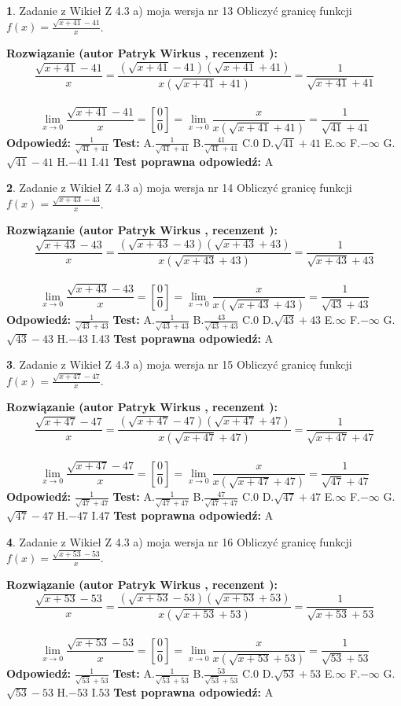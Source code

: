 \documentclass[12pt, a4paper]{article}
\theoremstyle{definition} %
\newtheorem{zad}{}
\newcommand{\zadStart}[1]{\begin{zad}#1\newline}
\newcommand{\zadStop}{\end{zad}}
\newcommand{\rozwStart}[2]{\noindent \textbf{Rozwiązanie (autor #1 , recenzent #2): }\newline}
\newcommand{\rozwStop}{\newline}
\newcommand{\odpStart}{\noindent \textbf{Odpowiedź:}\newline}
\newcommand{\odpStop}{\newline}
\newcommand{\testStart}{\noindent \textbf{Test:}\newline}
\newcommand{\testStop}{\newline}
\newcommand{\kluczStart}{\noindent \textbf{Test poprawna odpowiedź:}\newline}
\newcommand{\kluczStop}{\newline}
\begin{document}
\zadStart{Zadanie z Wikieł Z 4.3 a) moja wersja nr 13}
Obliczyć granicę funkcji $f(x)=\frac{\sqrt{x+41}-41}{x}$.
\zadStop
\rozwStart{Patryk Wirkus}{}
$$\frac{\sqrt{x+41}-41}{x}=\frac{(\sqrt{x+41}-41)(\sqrt{x+41}+41)}{x(\sqrt{x+41}+41)}=\frac{1}{\sqrt{x+41}+41}$$
\\
$$\lim\limits_{x\to0}\frac{\sqrt{x+41}-41}{x}=[\frac{0}{0}]=
\lim\limits_{x\to0}\frac{x}{x(\sqrt{x+41}+41)} = \frac{1}{\sqrt{41}+41}$$
\rozwStop
\odpStart
$\frac{1}{\sqrt{41}+41}$
\odpStop
\testStart
A.$\frac{1}{\sqrt{41}+41}$
B.$\frac{41}{\sqrt{41}+41}$
C.$0$
D.$\sqrt{41}+41$
E.$\infty$
F.$-\infty$
G.$\sqrt{41}-41$
H.$-41$
I.$41$
\testStop
\kluczStart
A
\kluczStop



\zadStart{Zadanie z Wikieł Z 4.3 a) moja wersja nr 14}
Obliczyć granicę funkcji $f(x)=\frac{\sqrt{x+43}-43}{x}$.
\zadStop
\rozwStart{Patryk Wirkus}{}
$$\frac{\sqrt{x+43}-43}{x}=\frac{(\sqrt{x+43}-43)(\sqrt{x+43}+43)}{x(\sqrt{x+43}+43)}=\frac{1}{\sqrt{x+43}+43}$$
\\
$$\lim\limits_{x\to0}\frac{\sqrt{x+43}-43}{x}=[\frac{0}{0}]=
\lim\limits_{x\to0}\frac{x}{x(\sqrt{x+43}+43)} = \frac{1}{\sqrt{43}+43}$$
\rozwStop
\odpStart
$\frac{1}{\sqrt{43}+43}$
\odpStop
\testStart
A.$\frac{1}{\sqrt{43}+43}$
B.$\frac{43}{\sqrt{43}+43}$
C.$0$
D.$\sqrt{43}+43$
E.$\infty$
F.$-\infty$
G.$\sqrt{43}-43$
H.$-43$
I.$43$
\testStop
\kluczStart
A
\kluczStop



\zadStart{Zadanie z Wikieł Z 4.3 a) moja wersja nr 15}
Obliczyć granicę funkcji $f(x)=\frac{\sqrt{x+47}-47}{x}$.
\zadStop
\rozwStart{Patryk Wirkus}{}
$$\frac{\sqrt{x+47}-47}{x}=\frac{(\sqrt{x+47}-47)(\sqrt{x+47}+47)}{x(\sqrt{x+47}+47)}=\frac{1}{\sqrt{x+47}+47}$$
\\
$$\lim\limits_{x\to0}\frac{\sqrt{x+47}-47}{x}=[\frac{0}{0}]=
\lim\limits_{x\to0}\frac{x}{x(\sqrt{x+47}+47)} = \frac{1}{\sqrt{47}+47}$$
\rozwStop
\odpStart
$\frac{1}{\sqrt{47}+47}$
\odpStop
\testStart
A.$\frac{1}{\sqrt{47}+47}$
B.$\frac{47}{\sqrt{47}+47}$
C.$0$
D.$\sqrt{47}+47$
E.$\infty$
F.$-\infty$
G.$\sqrt{47}-47$
H.$-47$
I.$47$
\testStop
\kluczStart
A
\kluczStop



\zadStart{Zadanie z Wikieł Z 4.3 a) moja wersja nr 16}
Obliczyć granicę funkcji $f(x)=\frac{\sqrt{x+53}-53}{x}$.
\zadStop
\rozwStart{Patryk Wirkus}{}
$$\frac{\sqrt{x+53}-53}{x}=\frac{(\sqrt{x+53}-53)(\sqrt{x+53}+53)}{x(\sqrt{x+53}+53)}=\frac{1}{\sqrt{x+53}+53}$$
\\
$$\lim\limits_{x\to0}\frac{\sqrt{x+53}-53}{x}=[\frac{0}{0}]=
\lim\limits_{x\to0}\frac{x}{x(\sqrt{x+53}+53)} = \frac{1}{\sqrt{53}+53}$$
\rozwStop
\odpStart
$\frac{1}{\sqrt{53}+53}$
\odpStop
\testStart
A.$\frac{1}{\sqrt{53}+53}$
B.$\frac{53}{\sqrt{53}+53}$
C.$0$
D.$\sqrt{53}+53$
E.$\infty$
F.$-\infty$
G.$\sqrt{53}-53$
H.$-53$
I.$53$
\testStop
\kluczStart
A
\kluczStop
\end{document}
